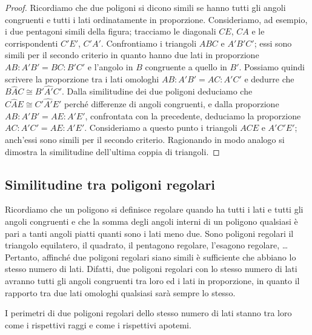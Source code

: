 \begin{figure*}[!htb]
	\centering
\end{figure*}

\begin{proof}
Ricordiamo che due poligoni si dicono simili se hanno tutti gli angoli congruenti e tutti i lati ordinatamente in proporzione. Consideriamo, ad esempio, i due pentagoni simili della figura; tracciamo le diagonali $CE$, $CA$ e le corrispondenti $C'E'$, $C'A'$. Confrontiamo i triangoli $ABC$ e $A'B'C'$; essi sono simili per il secondo criterio in quanto hanno due lati in proporzione $AB : A'B' = BC : B'C'$ e l'angolo in $B$ congruente a quello in $B'$. Possiamo quindi scrivere la proporzione tra i lati omologhi $AB : A'B' = AC : A'C'$ e dedurre che $B\widehat{A}C\cong B'\widehat{A'}C'$. Dalla similitudine dei due poligoni deduciamo che $C\widehat{A}E\cong C'\widehat{A'}E'$ perché differenze di angoli congruenti, e dalla proporzione $AB:A'B'=AE:A'E'$, confrontata con la precedente, deduciamo la proporzione $AC:A'C'=AE:A'E'$. Consideriamo a questo punto i triangoli $ACE$ e $A'C'E'$; anch'essi sono simili per il secondo criterio. Ragionando in modo analogo si dimostra la similitudine dell'ultima coppia di triangoli.
\end{proof}

\subsection{Similitudine tra poligoni regolari}

Ricordiamo che un poligono si definisce regolare quando ha tutti i lati e tutti gli angoli congruenti e che la somma degli angoli interni di un poligono qualsiasi è pari a tanti angoli piatti quanti sono i lati meno due. Sono poligoni regolari il triangolo equilatero, il quadrato, il pentagono regolare, l'esagono regolare, \ldots{} Pertanto, affinché due poligoni regolari siano simili è sufficiente che abbiano lo stesso numero di lati. Difatti, due poligoni regolari con lo stesso numero di lati avranno tutti gli angoli congruenti tra loro ed i lati in proporzione, in quanto il rapporto tra due lati omologhi qualsiasi sarà sempre lo stesso.

\begin{teorema}
I perimetri di due poligoni regolari dello stesso numero di lati stanno tra loro come i rispettivi raggi e come i rispettivi apotemi.
\end{teorema}

